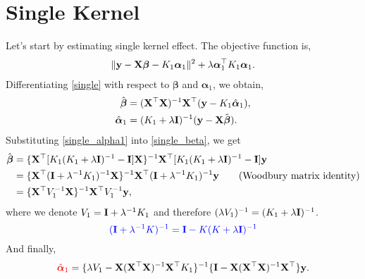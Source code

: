 \documentclass[11pt]{report}
\def\bI{{\bf I}}
\def\bX{{\bf X}}
\def\by{{\bf y}}
\def\bbeta{{\boldsymbol \beta}}
\def\balpha{{\boldsymbol \alpha}}
\begin{document}
\setcounter{equation}{0}
\renewcommand{\theequation}{\arabic{equation}}
\maketitle

\section{Single Kernel}
Let's start by estimating single kernel effect. The objective function is, 
\begin{align}
\lVert \by-\bX \bbeta -K_1 \balpha_1 \rVert^2 + \lambda \balpha_1^\top K_1 \balpha_1. \label{single}
\end{align}
Differentiating \eqref{single} with respect to $\bbeta$ and $\balpha_1$, we obtain, 
\begin{align}
\hat{\bbeta}&=(\bX^\top \bX)^{-1}\bX^\top (\by-K_1 \hat{\balpha}_1),  \label{single_beta}\\
\hat{\balpha}_1&=(K_1+\lambda \bI)^{-1}(\by-\bX \hat{\bbeta}). \label{single_alpha1}
\end{align}
Substituting \eqref{single_alpha1} into \eqref{single_beta}, we get 
\begin{align*}
\hat{\bbeta}&=\{\bX^\top [K_1(K_1+\lambda \bI)^{-1}-\bI]\bX \}^{-1}\bX^\top [K_1(K_1+\lambda \bI)^{-1}-\bI]\by \nonumber \\
&=\{\bX^\top (\bI+\lambda^{-1}K_1)^{-1} \bX \}^{-1}\bX^\top (\bI+\lambda^{-1}K_1)^{-1}\by \tag{Woodbury matrix identity} \\
&=\{\bX^\top V_1^{-1} \bX \}^{-1}\bX^\top V_1^{-1}\by,
\end{align*}
where we denote $V_1=\bI+\lambda^{-1}K_1$ and therefore $(\lambda V_1)^{-1}=(K_1+\lambda \bI)^{-1}$. 
$${\color{blue}(\bI + \lambda^{-1} K)^{-1}=\bI -K(K+\lambda \bI)^{-1}}$$
And finally,
\begin{align}
{\color{red}\hat{\balpha}_1}=\{\lambda V_1-\bX (\bX^\top \bX)^{-1}\bX^\top K_1\}^{-1}\{\bI-\bX (\bX^\top \bX)^{-1}\bX^\top \}\by. \label{single_alpha1_final}
\end{align}
\end{document}
